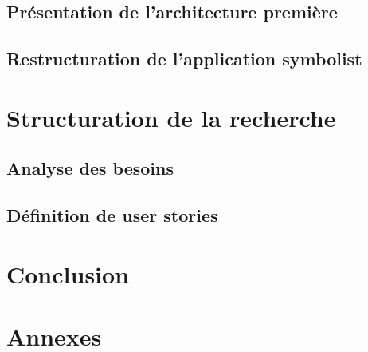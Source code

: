 \documentclass[utf8,final]{stageM2R} %
\begin{document}
	\section{Présentation de l'architecture première}
	\label{sec:architecturePremiere}
	

	\section{Restructuration de l'application symbolist}
	\label{sec:restructurationSymbolist}
	
	
\chapter{Structuration de la recherche}
\label{chap:structurationRecherche}

	\section{Analyse des besoins}
	\label{sec:analyseBesoins}
	
	
	\section{Définition de user stories}
	\label{sec:definitionUserStories}
	
	
\clearpage
\chapter{Conclusion}


\printbibliography

\listoffigures

\printglossary

\appendix
\chapter{Annexes}

\end{document}
